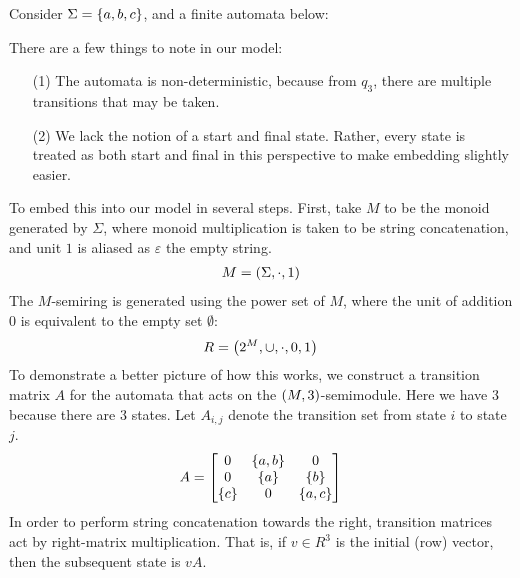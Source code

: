 \documentclass[12pt]{article}
\begin{document}
\begin{example}
  Consider \(\Sigma = \left\{a, b, c\right\}\),
  and a finite automata below:

  \begin{center}
  \end{center}
  There are a few things to note in our model:
  \begin{enumerate}
    \item[(1)]
      The automata is non-deterministic, because from \(q_3\),
      there are multiple transitions that may be taken.

    \item[(2)]
      We lack the notion of a start and final state.
      Rather, every state is treated as both start and final in
      this perspective to make embedding slightly easier.
  \end{enumerate}
  To embed this into our model in several steps.
  First, take \(M\) to be the monoid generated by \(\Sigma\),
  where monoid multiplication is taken to be string concatenation,
  and unit \(1\) is aliased as \(\varepsilon\) the empty string.
  \begin{align*}
    M = \left(\Sigma, \cdot, 1\right)
  \end{align*}
  The \(M\)-semiring is generated using the power set of \(M\),
  where the unit of addition \(0\) is equivalent to the
  empty set \(\emptyset\):
  \begin{align*}
    R = \left(2^{M}, \cup, \cdot, 0, 1\right)
  \end{align*}
  To demonstrate a better picture of how this works, we construct a
  transition matrix \(A\) for the automata
  that acts on the \(\left(M, 3\right)\)-semimodule.
  Here we have \(3\) because there are \(3\) states.
  Let \(A_{i, j}\) denote the transition set from state \(i\) to
  state \(j\).
  \begin{align*}
    A =
      \begin{bmatrix}
        0 & \left\{a, b\right\} & 0 \\
        0 & \left\{a\right\} & \left\{b\right\} \\
        \left\{c\right\} & 0 & \left\{a, c\right\}
      \end{bmatrix}
  \end{align*}
  In order to perform string concatenation towards the right,
  transition matrices act by right-matrix multiplication.
  That is, if \(v \in R^3\) is the initial (row) vector,
  then the subsequent state is \(v A\).


\end{example}
\end{document}
